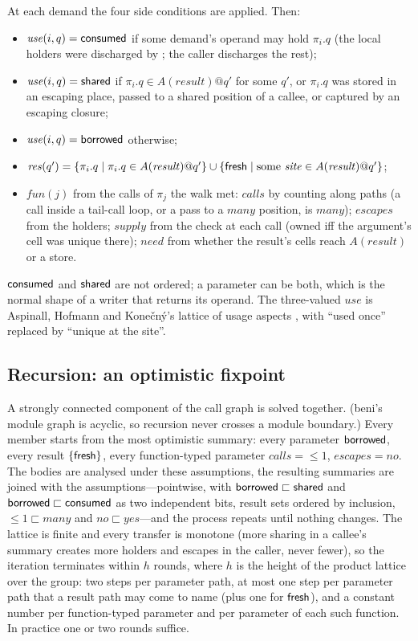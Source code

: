 At each demand the four side conditions are applied. Then:
\begin{itemize}
\item $\mathit{use}(i, q) = \mathsf{consumed}$ if some demand's operand may hold $\pi_i.q$ (the local holders
were discharged by \Dead; the caller discharges the rest);
\item $\mathit{use}(i, q) = \mathsf{shared}$ if $\pi_i.q \in A(\mathit{result})@q'$ for some $q'$, or $\pi_i.q$
was stored in an escaping place, passed to a shared position of a callee, or captured by an escaping
closure;
\item $\mathit{use}(i, q) = \mathsf{borrowed}$ otherwise;
\item $\mathit{res}(q') = \{\pi_i.q \mid \pi_i.q \in A(\mathit{result})@q'\} \cup \{\mathsf{fresh} \mid
\text{some } \mathit{site} \in A(\mathit{result})@q'\}$;
\item $\mathit{fun}(j)$ from the calls of $\pi_j$ the walk met: $\mathit{calls}$ by counting along
paths (a call inside a tail-call loop, or a pass to a $\mathit{many}$ position, is $\mathit{many}$);
$\mathit{escapes}$ from the holders; $\mathit{supply}$ from the check at each call (owned iff the
argument's cell was unique there); $\mathit{need}$ from whether the result's cells reach
$A(\mathit{result})$ or a store.
\end{itemize}
$\mathsf{consumed}$ and $\mathsf{shared}$ are not ordered; a parameter can be both, which is the normal shape of a
writer that returns its operand. The three-valued $\mathit{use}$ is Aspinall, Hofmann and
Kone\v{c}n\'y's lattice of usage aspects \citep[\S1]{aspinall2008usage}, with ``used once'' replaced by
``unique at the site''.

\subsection{Recursion: an optimistic fixpoint}
\label{sec:inf-recursion}

A strongly connected component of the call graph is solved together. (beni's module graph is
acyclic, so recursion never crosses a module boundary.) Every member starts from the most
optimistic summary: every parameter $\mathsf{borrowed}$, every result $\{\mathsf{fresh}\}$, every function-typed
parameter $\mathit{calls} = {\le}1$, $\mathit{escapes} = \mathit{no}$. The bodies are analysed under
these assumptions, the resulting summaries are joined with the assumptions---pointwise, with
$\mathsf{borrowed} \sqsubset \mathsf{shared}$ and $\mathsf{borrowed} \sqsubset \mathsf{consumed}$ as two independent bits, result
sets ordered by inclusion, ${\le}1 \sqsubset \mathit{many}$ and $\mathit{no} \sqsubset
\mathit{yes}$---and the process repeats until nothing changes. The lattice is finite and every
transfer is monotone (more sharing in a callee's summary creates more holders and escapes in the
caller, never fewer), so the iteration terminates within $h$ rounds, where $h$ is the height of the
product lattice over the group: two steps per parameter path, at most one step per parameter path
that a result path may come to name (plus one for $\mathsf{fresh}$), and a constant number per function-typed
parameter and per parameter of each such function. In practice one or two rounds suffice.

